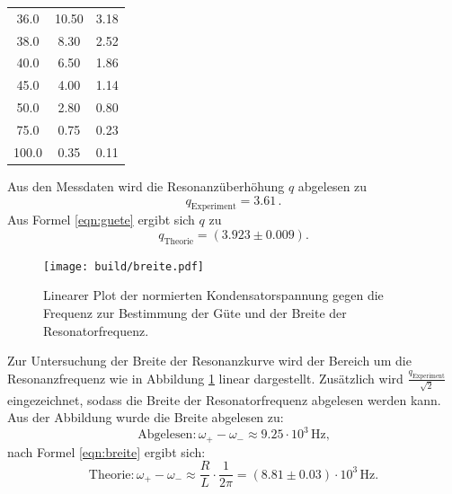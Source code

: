 \begin{table}
\begin{tabular}{ccc}
		36.0                        & 10.50                     & 3.18                      \\
		38.0                        & 8.30                      & 2.52                      \\
		40.0                        & 6.50                      & 1.86                      \\
		45.0                        & 4.00                      & 1.14                      \\
		50.0                        & 2.80                      & 0.80                      \\
		75.0                        & 0.75                      & 0.23                      \\
		100.0                       & 0.35                      & 0.11                      \\
		\bottomrule
	\end{tabular}
\end{table}

Aus den Messdaten wird die Resonanzüberhöhung $q$ abgelesen zu
\begin{equation*}
	q_\mathrm{Experiment}= 3.61 \, .
\end{equation*}
Aus Formel \eqref{eqn:guete} ergibt sich $q$ zu
\begin{equation*}
	q_\mathrm{Theorie}= (3.923 \pm 0.009) .
\end{equation*}

\begin{figure}
	\texttt{[image: build/breite.pdf]}
	\caption{Linearer Plot der normierten Kondensatorspannung gegen die Frequenz zur Bestimmung der Güte und der Breite der Resonatorfrequenz.}
	\label{fig:breite}
\end{figure}
Zur Untersuchung der Breite der Resonanzkurve wird der Bereich um die Resonanzfrequenz
wie in Abbildung \ref{fig:breite} linear dargestellt.
Zusätzlich wird $\frac{q_\mathrm{Experiment}}{\sqrt{2}}$ eingezeichnet, sodass die Breite der Resonatorfrequenz abgelesen werden kann.
Aus der Abbildung wurde die Breite abgelesen zu:
\begin{equation*}
	\text{Abgelesen}: \omega_+ - \omega_- \approx 9.25 \cdot 10^{3} \,\si{\Hz} \text{,}
\end{equation*}
nach Formel \eqref{eqn:breite} ergibt sich:
\begin{equation*}
	\text{Theorie}: 	\omega_+ - \omega_- \approx \frac{R}{L}\cdot \frac{1}{2\pi}=(8.81\pm 0.03) \cdot 10^{3} \,\si{\Hz} \text{.}
\end{equation*}
